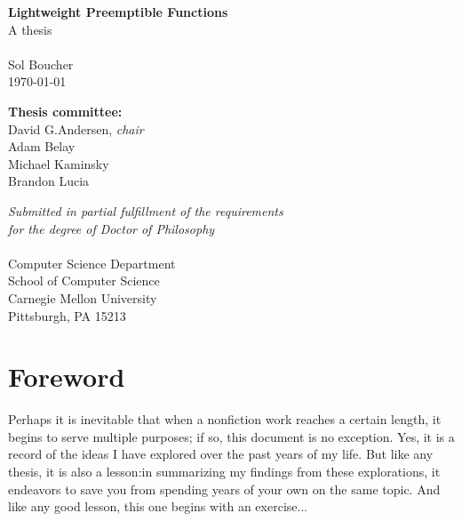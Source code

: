 \documentclass[12pt,letterpaper,openright]{report}
\begin{document}
\begin{titlepage}
\begin{center}
	\vspace*{\fill}

	\textbf{\Large Lightweight Preemptible Functions} \\
	A thesis \\
	\hfill \\
	{\large Sol Boucher} \\
	\today \\

	\vspace{1in}

	\textbf{Thesis committee:} \\
	David G.\@ Andersen, \textit{chair} \\
	Adam Belay \\
	Michael Kaminsky \\
	Brandon Lucia \\

	\vspace{\fill}

	\textit{Submitted in partial fulfillment of the requirements \\
	for the degree of Doctor of Philosophy} \\
	\hfill \\
	Computer Science Department \\
	School of Computer Science \\
	Carnegie Mellon University \\
	Pittsburgh, PA 15213 \\
\end{center}
\end{titlepage}

\tableofcontents
\listoffigures
\listoftables
\lstlistoflistings
\newpage
{}

\chapter*{Foreword}

Perhaps it is inevitable that when a nonfiction work reaches a certain length, it
begins to serve multiple purposes; if so, this document is no exception.  Yes, it is
a record of the ideas I have explored over the past years of my life.  But like any
thesis, it is also a lesson:\@ in summarizing my findings from these explorations, it
endeavors to save you from spending years of your own on the same topic.  And like
any good lesson, this one begins with an exercise...
\end{document}
